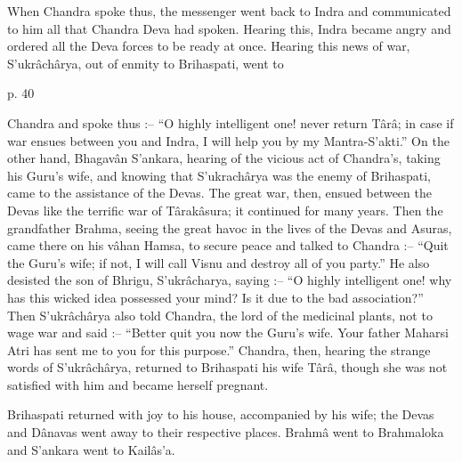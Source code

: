  

When Chandra spoke thus, the messenger went back to Indra and communicated to him all that Chandra Deva had spoken. Hearing this, Indra became angry and ordered all the Deva forces to be ready at once. Hearing this news of war, S'ukrâchârya, out of enmity to Brihaspati, went to

 

p. 40

 

Chandra and spoke thus :-- “O highly intelligent one! never return Târâ; in case if war ensues between you and Indra, I will help you by my Mantra-S'akti.” On the other hand, Bhagavân S'ankara, hearing of the vicious act of Chandra's, taking his Guru's wife, and knowing that S'ukrachârya was the enemy of Brihaspati, came to the assistance of the Devas. The great war, then, ensued between the Devas like the terrific war of Târakâsura; it continued for many years. Then the grandfather Brahma, seeing the great havoc in the lives of the Devas and Asuras, came there on his vâhan Hamsa, to secure peace and talked to Chandra :-- “Quit the Guru's wife; if not, I will call Visnu and destroy all of you party.” He also desisted the son of Bhrigu, S'ukrâcharya,  saying :-- “O highly intelligent one! why has this wicked idea possessed your mind? Is it due to the bad association?” Then S'ukrâchârya also told Chandra, the lord of the medicinal plants, not to wage war and said :-- “Better quit you now the Guru's wife. Your father Maharsi Atri has sent me to you for this purpose.” Chandra, then, hearing the strange words of S'ukrâchârya, returned to Brihaspati his wife Târâ, though she was not satisfied with him and became herself pregnant.

 

Brihaspati returned with joy to his house, accompanied by his wife; the Devas and Dânavas went away to their respective places. Brahmâ went to Brahmaloka and S'ankara went to Kailâs'a.

 

